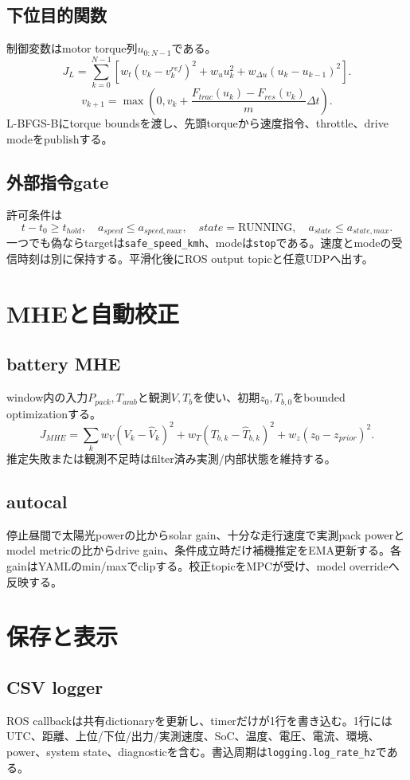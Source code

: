 \documentclass[a4paper,10pt,oneside]{book}
\begin{document}
\section{下位目的関数}
制御変数はmotor torque列$u_{0:N-1}$である。
\[
J_L=\sum_{k=0}^{N-1}\left[
w_t(v_k-v^{ref}_k)^2+w_u u_k^2+w_{\Delta u}(u_k-u_{k-1})^2
\right].
\]
\[
v_{k+1}=\max\left(0,v_k+\frac{F_{trac}(u_k)-F_{res}(v_k)}{m}\Delta t\right).
\]
L-BFGS-Bにtorque boundsを渡し、先頭torqueから速度指令、throttle、drive modeをpublishする。

\section{外部指令gate}
許可条件は
\[
t-t_0\ge t_{hold},\quad a_{speed}\le a_{speed,max},\quad
state=\mathrm{RUNNING},\quad a_{state}\le a_{state,max}.
\]
一つでも偽ならtargetは\texttt{safe\_speed\_kmh}、modeは\texttt{stop}である。速度とmodeの受信時刻は別に保持する。平滑化後にROS output topicと任意UDPへ出す。

\chapter{MHEと自動校正}
\section{battery MHE}
window内の入力$P_{pack},T_{amb}$と観測$V,T_b$を使い、初期$z_0,T_{b,0}$をbounded optimizationする。
\[
J_{MHE}=\sum_k w_V(V_k-\hat V_k)^2+w_T(T_{b,k}-\hat T_{b,k})^2
+w_z(z_0-z_{prior})^2.
\]
推定失敗または観測不足時はfilter済み実測/内部状態を維持する。

\section{autocal}
停止昼間で太陽光powerの比からsolar gain、十分な走行速度で実測pack powerとmodel metricの比からdrive gain、条件成立時だけ補機推定をEMA更新する。各gainはYAMLのmin/maxでclipする。校正topicをMPCが受け、model overrideへ反映する。

\chapter{保存と表示}
\section{CSV logger}
ROS callbackは共有dictionaryを更新し、timerだけが1行を書き込む。1行にはUTC、距離、上位/下位/出力/実測速度、SoC、温度、電圧、電流、環境、power、system state、diagnosticを含む。書込周期は\texttt{logging.log\_rate\_hz}である。
\end{document}

